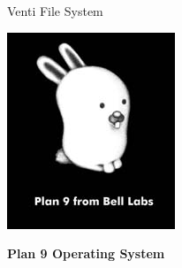\begin{frame}[t]{Venti File System}

  \hspace*{.6in}
  \begin{minipage}{3.5in}
  \begin{center}
	\vspace*{.4in}

  	\includegraphics[scale=1.6]{plan9.jpg}

	\vspace*{.3in}
	\textbf{Plan 9 Operating System}
	  
  \end{center}
  \end{minipage}

\end{frame}